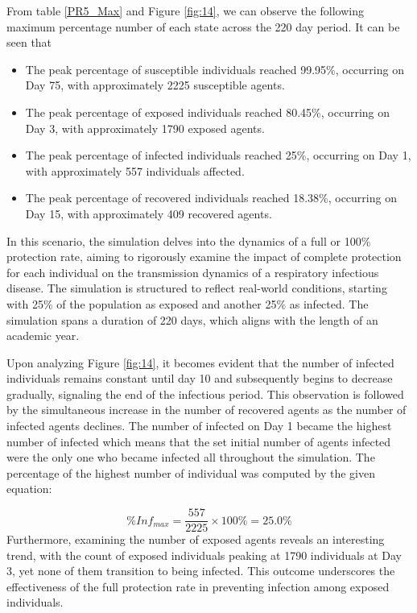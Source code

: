 From table \ref{PR5_Max} and Figure \ref{fig:14}, we can observe the following maximum percentage number of each state across the 220 day period. It can be seen that 

\begin{itemize}
	\item The peak percentage of susceptible individuals reached 99.95\%, occurring on Day 75, with approximately 2225 susceptible agents.
	\item The peak percentage of exposed individuals reached 80.45\%, occurring on Day 3, with approximately 1790 exposed agents.
	\item The peak percentage of infected individuals reached 25\%, occurring on Day 1, with approximately 557 individuals affected.
	\item The peak percentage of recovered individuals reached 18.38\%, occurring on Day 15, with approximately 409 recovered agents. 
\end{itemize}
In this scenario, the simulation delves into the dynamics of a full or 100\% protection rate, aiming to rigorously examine the impact of complete protection for each individual on the transmission dynamics of a respiratory infectious disease. The simulation is structured to reflect real-world conditions, starting with 25\% of the population as exposed and another 25\% as infected. The simulation spans a duration of 220 days, which aligns with the length of an academic year.

Upon analyzing Figure \ref{fig:14}, it becomes evident that the number of infected individuals remains constant until day 10 and subsequently begins to decrease gradually, signaling the end of the infectious period. This observation is followed by the simultaneous increase in the number of recovered agents as the number of infected agents declines. The number of infected on Day 1 became the highest number of infected which means that the set initial number of agents infected were the only one who became infected all throughout the simulation. The percentage of the highest number of individual was computed by the given equation:

\[ \%Inf_{max}  = \frac{557}{2225} \times 100\%  = 25.0\%\]
Furthermore, examining the number of exposed agents reveals an interesting trend, with the count of exposed individuals peaking at 1790 individuals at Day 3, yet none of them transition to being infected. This outcome underscores the effectiveness of the full protection rate in preventing infection among exposed individuals.

